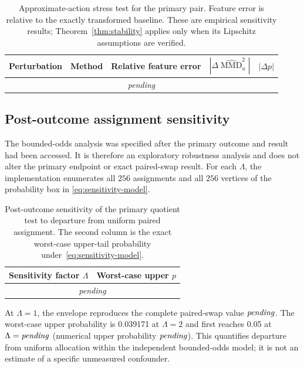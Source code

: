 \documentclass[11pt]{article}
\theoremstyle{plain}
\theoremstyle{definition}
\numberwithin{equation}{section}
\DeclareMathOperator{\MMD}{MMD}
\newcommand{\1}{\mathbf 1}
\newcommand{\pending}{\textnormal{\textit{pending}}}
\providecommand{\RxPermutationCount}{256}
\providecommand{\RxApproximateStressRows}{\multicolumn{5}{c}{\pending}\\}
\providecommand{\RxSensitivityRows}{\multicolumn{2}{c}{\pending}\\}
\providecommand{\RxSensitivityCritical}{\pending}
\providecommand{\RxSensitivityCriticalP}{\pending}
\providecommand{\RxExtensionExactP}{\pending}
\begin{document}
\begin{table}[t]
\caption{Approximate-action stress test for the primary pair. Feature error is relative to the exactly transformed baseline. These are empirical sensitivity results; Theorem~\ref{thm:stability} applies only when its Lipschitz assumptions are verified.\label{tab:approx}}
\centering\scriptsize
\begin{tabular}{@{}llrrr@{}}
\toprule
Perturbation & Method & Relative feature error & $|\Delta\widehat{\MMD}_u^2|$ & $|\Delta p|$\\
\midrule
\RxApproximateStressRows
\bottomrule
\end{tabular}
\end{table}

\subsection{Post-outcome assignment sensitivity}

The bounded-odds analysis was specified after the primary outcome and result
had been accessed. It is therefore an exploratory robustness analysis and does
not alter the primary endpoint or exact paired-swap result. For each
$\Lambda$, the implementation enumerates all $\RxPermutationCount$
assignments and all $\RxPermutationCount$ vertices of the probability box in
\eqref{eq:sensitivity-model}.

\begin{table}[!htbp]
\caption{Post-outcome sensitivity of the primary quotient test to departure
from uniform paired assignment. The second column is the exact worst-case
upper-tail probability under~\eqref{eq:sensitivity-model}.
\label{tab:sensitivity}}
\centering
\begin{tabular}{@{}cc@{}}
\toprule
Sensitivity factor $\Lambda$ & Worst-case upper $p$\\
\midrule
\RxSensitivityRows
\bottomrule
\end{tabular}
\end{table}

At $\Lambda=1$, the envelope reproduces the complete paired-swap value
$\RxExtensionExactP$. The worst-case upper probability is 0.039171 at
$\Lambda=2$ and first reaches 0.05 at
$\Lambda=\RxSensitivityCritical$ (numerical upper probability
$\RxSensitivityCriticalP$). This quantifies departure from uniform allocation
within the independent bounded-odds model; it is not an estimate of a specific
unmeasured confounder.
\end{document}
